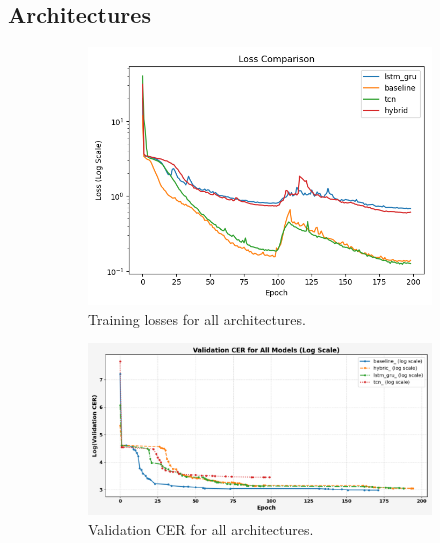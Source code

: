 \subsection{Architectures}

\begin{figure}
    \centering
    \begin{subfigure}[b]{0.3\textwidth}
        \centering
        \includegraphics[width=\textwidth]{figures/all_losses.png}
        \caption{Training losses for all architectures.}
        \label{fig:y equals x}
    \end{subfigure}
    \hfill
    \begin{subfigure}[b]{0.3\textwidth}
        \centering
        \includegraphics[width=\textwidth]{figures/Val_cer.png}
        \caption{Validation CER for all architectures.}
    \end{subfigure}
    \hfill
    \begin{subfigure}[b]{0.3\textwidth}
        \centering

\end{subfigure}
\end{figure}
